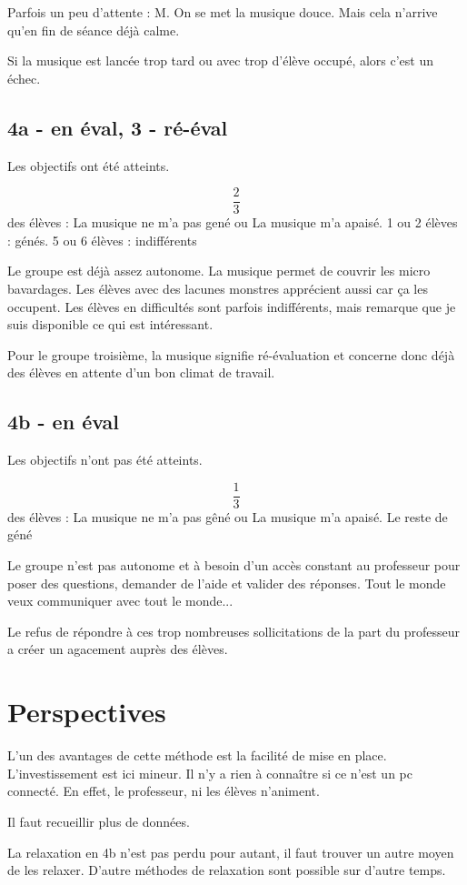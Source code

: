 \documentclass[11pt]{article}
\begin{document}
	Parfois un peu d'attente : M. On se met la musique douce. Mais cela n'arrive qu'en fin de séance déjà calme.
	
	Si la musique est lancée trop tard ou avec trop d'élève occupé, alors c'est un échec.
	
	\subsection{4a - en éval, 3 - ré-éval}
	Les objectifs ont été atteints.
	
	$$\dfrac{2}{3}$$ des élèves : La musique ne m'a pas gené ou La musique m'a apaisé.
	1 ou 2 élèves : génés.
	5 ou 6 élèves : indifférents
	
	Le groupe est déjà assez autonome. La musique permet de couvrir les micro bavardages. Les élèves avec des lacunes monstres apprécient aussi car ça les occupent.
	Les élèves en difficultés sont parfois indifférents, mais remarque que je suis disponible ce qui est intéressant.
	
	Pour le groupe troisième, la musique signifie ré-évaluation et concerne donc déjà des élèves en attente d'un bon climat de travail.
	
	\subsection{4b - en éval}
	Les objectifs n'ont pas été atteints.
	
	$$\dfrac{1}{3}$$ des élèves : La musique ne m'a pas gêné ou La musique m'a apaisé.
	Le reste de géné
	
	Le groupe n'est pas autonome et à besoin d'un accès constant au professeur pour poser des questions, demander de l'aide et valider des réponses. Tout le monde veux communiquer avec tout le monde...
	
	Le refus de répondre à ces trop nombreuses sollicitations de la part du professeur a créer un agacement auprès des élèves. 
	
	\newpage
	
	\section{Perspectives}
	
	L'un des avantages de cette méthode est la facilité de mise en place. L'investissement est ici mineur. Il n'y a rien à connaître si ce n'est un pc connecté. En effet, le professeur, ni les élèves n'animent. 
	
	Il faut recueillir plus de données. 
	
	La relaxation en 4b n'est pas perdu pour autant, il faut trouver un autre moyen de les relaxer. D'autre méthodes de relaxation sont possible sur d'autre temps. 
	
	
\end{document}
